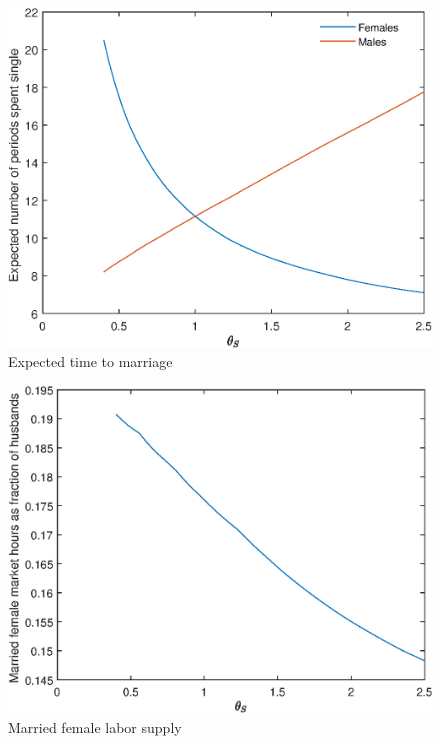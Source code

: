 \documentclass[12pt]{article}
\begin{document}
\begin{figure}
	\centering
	\caption{Expected time to marriage}
	\includegraphics{Graphs/exp_single_theta_S_ex1.eps}
\end{figure}

\begin{figure}
	\centering
	\caption{Married female labor supply}
	\includegraphics{Graphs/lf_theta_S_ex1.eps}
\end{figure}
\end{document}
